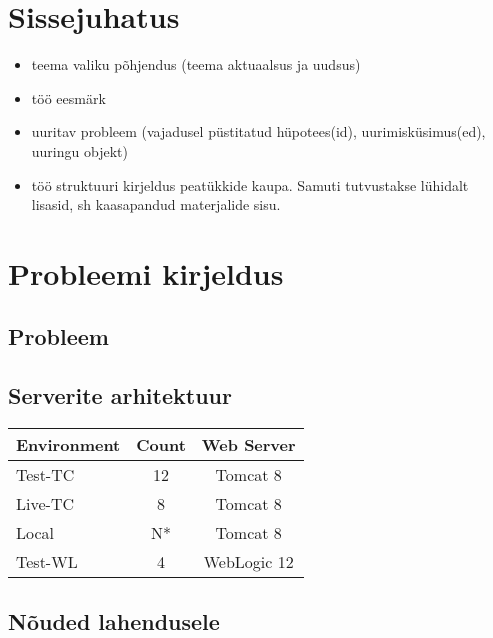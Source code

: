 \documentclass[12pt]{report}
\renewcommand{\headrulewidth}{0pt}
\begin{document}
  \tableofcontents
  \fancypagestyle{plain}{%
    \renewcommand{\headrulewidth}{0pt}%
    \fancyhf{}%
    \fancyfoot[R]{\thepage}%
}
 
  \newpage
  
  \section*{Sissejuhatus}
  \label{sissejuhatus}
  
  \begin{itemize}
    \item teema valiku põhjendus (teema aktuaalsus ja uudsus)
    \item töö eesmärk
    \item  uuritav probleem (vajadusel püstitatud hüpotees(id), uurimisküsimus(ed), uuringu objekt)
    \item töö struktuuri kirjeldus peatükkide kaupa. Samuti tutvustakse lühidalt lisasid, sh kaasapandud
materjalide sisu.
  \end{itemize}
  
  \newpage
  
  \section{Probleemi kirjeldus}
  
  \subsection{Probleem}
  
  \subsection{Serverite arhitektuur}
  
  \begin{tabular}{|l|c|c|}
    \hline
    Environment & Count & Web Server\\
    \hline
    Test-TC & 12 & Tomcat 8\\
    Live-TC & 8 & Tomcat 8\\
    Local & N* & Tomcat 8\\
    Test-WL & 4 & WebLogic 12\\
    \hline
  \end{tabular}

  
  \subsection{Nõuded lahendusele}
  
\end{document}

